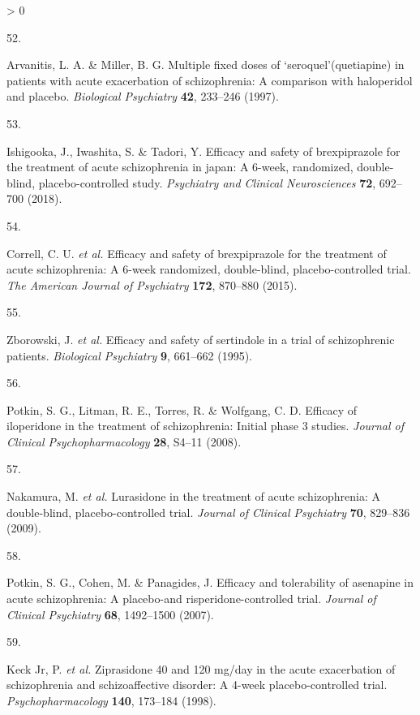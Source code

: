 \documentclass[
  9pt,
  english,
  ,jou,floatsintext]{apa6}
\newlength{\cslhangindent}
\newlength{\csllabelwidth}
\newenvironment{CSLReferences}[2] %
 {%
  \setlength{\parindent}{0pt}
  \ifodd #1 \everypar{\setlength{\hangindent}{\cslhangindent}}\ignorespaces\fi
  \ifnum #2 > 0
  \setlength{\parskip}{#2\baselineskip}
  \fi
 }%
 {}
\newcommand{\CSLLeftMargin}[1]{\parbox[t]{\csllabelwidth}{#1}}
\newcommand{\CSLRightInline}[1]{\parbox[t]{\linewidth - \csllabelwidth}{#1}\break}
\begin{document}
\begin{CSLReferences}{0}{0}
\leavevmode\hypertarget{ref-Arvanitis1997}{}%
\CSLLeftMargin{52. }
\CSLRightInline{Arvanitis, L. A. \& Miller, B. G. Multiple fixed doses of {`seroquel'}(quetiapine) in patients with acute exacerbation of schizophrenia: A comparison with haloperidol and placebo. \emph{Biological Psychiatry} \textbf{42}, 233--246 (1997).}

\leavevmode\hypertarget{ref-Ishigooka2018}{}%
\CSLLeftMargin{53. }
\CSLRightInline{Ishigooka, J., Iwashita, S. \& Tadori, Y. Efficacy and safety of brexpiprazole for the treatment of acute schizophrenia in japan: A 6-week, randomized, double-blind, placebo-controlled study. \emph{Psychiatry and Clinical Neurosciences} \textbf{72}, 692--700 (2018).}

\leavevmode\hypertarget{ref-Correll2015}{}%
\CSLLeftMargin{54. }
\CSLRightInline{Correll, C. U. \emph{et al.} Efficacy and safety of brexpiprazole for the treatment of acute schizophrenia: A 6-week randomized, double-blind, placebo-controlled trial. \emph{The American Journal of Psychiatry} \textbf{172}, 870--880 (2015).}

\leavevmode\hypertarget{ref-Zborowski1995}{}%
\CSLLeftMargin{55. }
\CSLRightInline{Zborowski, J. \emph{et al.} Efficacy and safety of sertindole in a trial of schizophrenic patients. \emph{Biological Psychiatry} \textbf{9}, 661--662 (1995).}

\leavevmode\hypertarget{ref-Potkin2008}{}%
\CSLLeftMargin{56. }
\CSLRightInline{Potkin, S. G., Litman, R. E., Torres, R. \& Wolfgang, C. D. Efficacy of iloperidone in the treatment of schizophrenia: Initial phase 3 studies. \emph{Journal of Clinical Psychopharmacology} \textbf{28}, S4--11 (2008).}

\leavevmode\hypertarget{ref-Nakamura2009}{}%
\CSLLeftMargin{57. }
\CSLRightInline{Nakamura, M. \emph{et al.} Lurasidone in the treatment of acute schizophrenia: A double-blind, placebo-controlled trial. \emph{Journal of Clinical Psychiatry} \textbf{70}, 829--836 (2009).}

\leavevmode\hypertarget{ref-Potkin2007}{}%
\CSLLeftMargin{58. }
\CSLRightInline{Potkin, S. G., Cohen, M. \& Panagides, J. Efficacy and tolerability of asenapine in acute schizophrenia: A placebo-and risperidone-controlled trial. \emph{Journal of Clinical Psychiatry} \textbf{68}, 1492--1500 (2007).}

\leavevmode\hypertarget{ref-Keck1998}{}%
\CSLLeftMargin{59. }
\CSLRightInline{Keck Jr, P. \emph{et al.} Ziprasidone 40 and 120 mg/day in the acute exacerbation of schizophrenia and schizoaffective disorder: A 4-week placebo-controlled trial. \emph{Psychopharmacology} \textbf{140}, 173--184 (1998).}


\end{CSLReferences}
\end{document}
